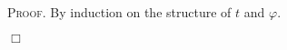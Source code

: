 \documentclass{article}
\newenvironment{proof}{\smallskip\textsc{Proof.}}{\hspace*{\fill}$\Box$}
\newcommand{\T}{\textsf T}
\newcommand{\ifte}{\textsf{if-then-else}}
\newcommand{\starfun}[1]{\ensuremath{{#1}^\ast}}
\newcommand{\starmap}{\starfun\cdot}
\newcommand{\modelfunm}[1]{\ensuremath{\mathfrak{#1}_\ast}}
\newcommand{\intm}[3]{\ensuremath{[\![{#3}]\!]^{\mathsf{#1}}_{\mathfrak{#2}}}}
\newcommand{\ints}[4]{\ensuremath{[\![{#4}]\!]^{\mathsf{#1}}_{\mathfrak{#2},{#3}}}}
\begin{document}
\begin{proof}
By induction on the structure of $t$ and $\varphi$.





\end{proof}
\end{document}
